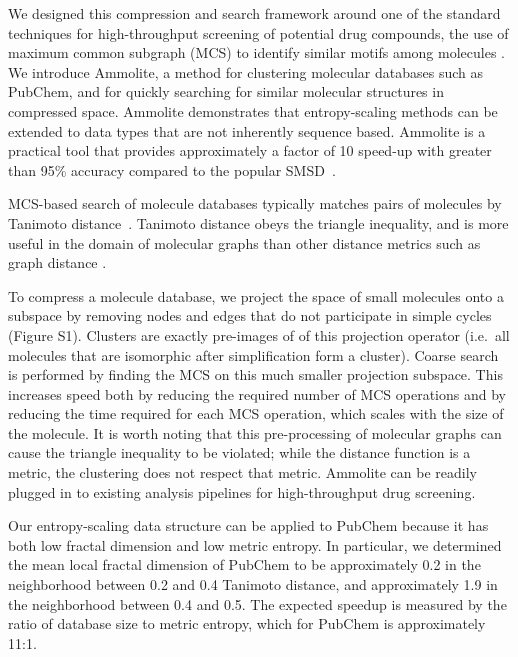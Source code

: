\documentclass[review,preprint,12pt]{elsarticle}
\renewcommand{\cite}{\citep} %
\theoremstyle{definition}
\theoremstyle{remark}
\numberwithin{equation}{section}
\begin{document}
We designed this compression and search framework around one of the standard 
techniques for high-throughput screening of potential drug compounds, the use 
of maximum common subgraph (MCS) to identify similar motifs among molecules \cite{cao2008maximum, rahman2009small}.
We introduce Ammolite, a method for clustering molecular databases such as 
PubChem, and for quickly searching for 
similar molecular structures in compressed space.
Ammolite demonstrates that entropy-scaling methods can be extended to data types that are not inherently sequence based.
Ammolite is a practical 
tool that provides approximately a factor of 10 speed-up with greater than 95\% accuracy compared to the popular SMSD~\cite{rahman2009small}.

MCS-based search of molecule databases typically matches pairs of molecules by 
Tanimoto distance~\cite{rahman2009small}. 
Tanimoto distance obeys the triangle inequality, and is more useful in the 
domain of molecular graphs than other
distance metrics such as graph distance \cite{bunke1998graph}.

To compress a molecule database, we project the space of small molecules onto a subspace by removing nodes and edges that do not participate in simple cycles
(Figure S1).
Clusters are exactly pre-images of of this projection operator (i.e.~all molecules that are isomorphic after simplification form a cluster).
Coarse search is performed by finding the MCS on this much smaller projection subspace. This increases speed both by reducing the required number of MCS operations 
and by reducing the time required for each MCS operation, which scales with the size of the molecule.
It is worth noting that this pre-processing of molecular graphs can cause the 
triangle inequality to be violated; while the distance function is a metric, the
clustering does not respect that metric.
Ammolite can be readily plugged in to existing analysis pipelines for 
high-throughput drug screening.

Our entropy-scaling data structure can be applied to PubChem because it has both low fractal
dimension and low metric entropy.
In particular, we determined the mean local fractal dimension of PubChem to be 
approximately 0.2 in the neighborhood between 0.2 and 0.4 Tanimoto distance,
and approximately 1.9 in the neighborhood between 0.4 and 0.5.
The expected speedup is measured by the ratio of database size to metric entropy, which for PubChem is approximately 11:1.
\end{document}
